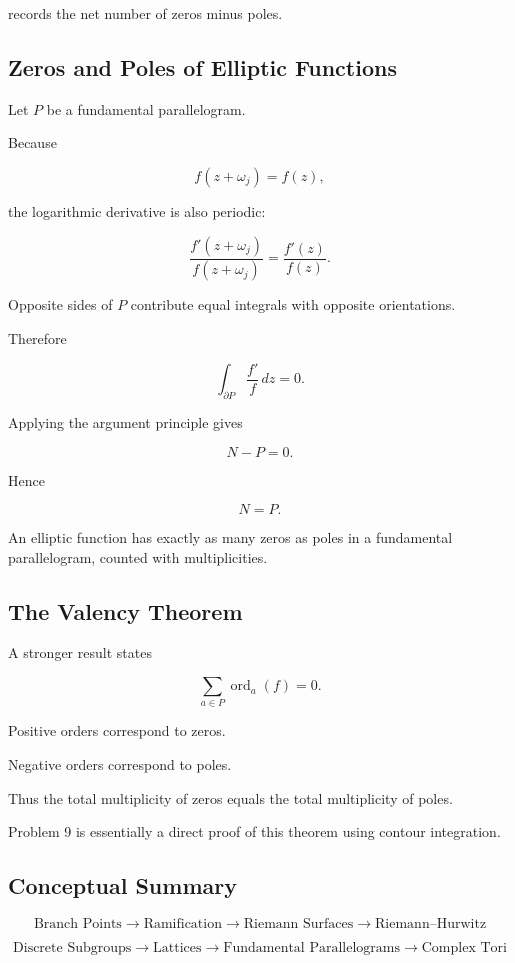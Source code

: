 \documentclass[12pt,a4paper]{article}
\theoremstyle{notespace}
\begin{document}
records the net number of zeros minus poles.

\subsection{Zeros and Poles of Elliptic Functions}

Let \(P\) be a fundamental parallelogram.

Because

\[
f(z+\omega_j)=f(z),
\]

the logarithmic derivative is also periodic:

\[
\frac{f'(z+\omega_j)}
{f(z+\omega_j)}
=
\frac{f'(z)}
{f(z)}.
\]

Opposite sides of \(P\) contribute equal integrals with opposite orientations.

Therefore

\[
\int_{\partial P}
\frac{f'}{f}\,dz
=
0.
\]

Applying the argument principle gives

\[
N-P=0.
\]

Hence

\[
\boxed{
	N=P.
}
\]

An elliptic function has exactly as many zeros as poles in a fundamental parallelogram, counted with multiplicities.

\subsection{The Valency Theorem}

A stronger result states

\[
\sum_{a\in P}
\operatorname{ord}_a(f)
=
0.
\]

Positive orders correspond to zeros.

Negative orders correspond to poles.

Thus the total multiplicity of zeros equals the total multiplicity of poles.

Problem 9 is essentially a direct proof of this theorem using contour integration.

\subsection{Conceptual Summary}

\[
\text{Branch Points}
\longrightarrow
\text{Ramification}
\longrightarrow
\text{Riemann Surfaces}
\longrightarrow
\text{Riemann--Hurwitz}
\]

\[
\text{Discrete Subgroups}
\longrightarrow
\text{Lattices}
\longrightarrow
\text{Fundamental Parallelograms}
\longrightarrow
\text{Complex Tori}
\]
\end{document}
